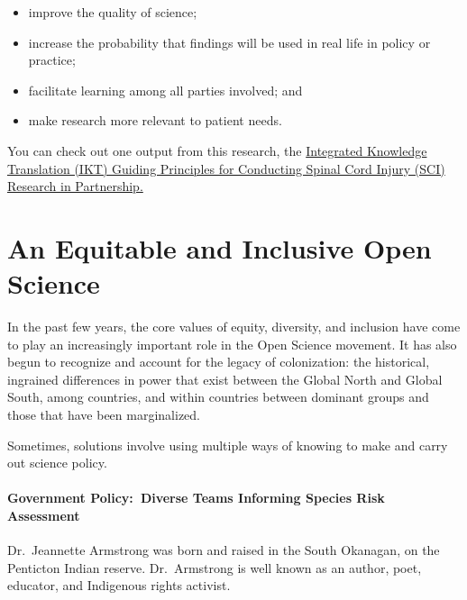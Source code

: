 \documentclass[
]{book}
\providecommand{\tightlist}{%
  \setlength{\itemsep}{0pt}\setlength{\parskip}{0pt}}
\begin{document}
\begin{itemize}
\tightlist
\item
  improve the quality of science;
\item
  increase the probability that findings will be used in real life in policy or practice;
\item
  facilitate learning among all parties involved; and
\item
  make research more relevant to patient needs.
\end{itemize}

You can check out one output from this research, the \href{http://ok-ikt-2019.sites.olt.ubc.ca/files/2021/02/IKT_Guiding_Principles_Feb_2021_1.pdf}{Integrated Knowledge Translation (IKT) Guiding Principles for Conducting Spinal Cord Injury (SCI) Research in Partnership.}

\hypertarget{an-equitable-and-inclusive-open-science}{%
\section{An Equitable and Inclusive Open Science}\label{an-equitable-and-inclusive-open-science}}

In the past few years, the core values of equity, diversity, and inclusion have come to play an increasingly important role in the Open Science movement. It has also begun to recognize and account for the legacy of colonization: the historical, ingrained differences in power that exist between the Global North and Global South, among countries, and within countries between dominant groups and those that have been marginalized.

Sometimes, solutions involve using multiple ways of knowing to make and carry out science policy.

\hypertarget{government-policy-diverse-teams-informing-species-risk-assessment}{%
\paragraph*{Government Policy:~Diverse Teams Informing Species Risk Assessment}\label{government-policy-diverse-teams-informing-species-risk-assessment}}

Dr.~Jeannette Armstrong was born and raised in the South Okanagan, on the Penticton Indian reserve. Dr.~Armstrong is well known as an author, poet, educator, and Indigenous rights activist.
\end{document}
